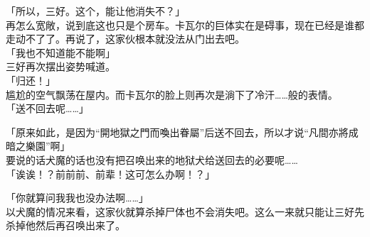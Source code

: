 「所以，三好。这个，能让他消失不？」\\

再怎么宽敞，说到底这也只是个房车。卡瓦尔的巨体实在是碍事，现在已经是谁都走动不了了。再说了，这家伙根本就没法从门出去吧。\\

「我也不知道能不能啊」\\

三好再次摆出姿势喊道。\\

「归还！」\\

尴尬的空气飘荡在屋内。而卡瓦尔的脸上则再次是淌下了冷汗……般的表情。\\

「送不回去呢……」

「原来如此，是因为“開地獄之門而喚出眷屬”后送不回去，所以才说“凡間亦將成暗之樂園”啊」\\

要说的话犬魔的话也没有把召唤出来的地狱犬给送回去的必要呢……\\

「诶诶！？前前前、前辈！这可怎么办啊！？」

「你就算问我我也没办法啊……」\\

以犬魔的情况来看，这家伙就算杀掉尸体也不会消失吧。这么一来就只能让三好先杀掉他然后再召唤出来了。

